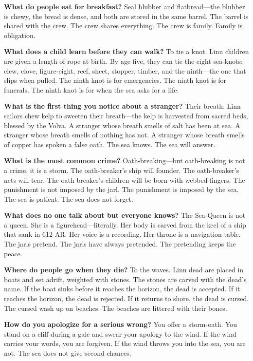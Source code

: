 \begin{almanac}
\textbf{What do people eat for breakfast?} Seal blubber and flatbread---the blubber is chewy, the bread is dense, and both are stored in the same barrel. The barrel is shared with the crew. The crew shares everything. The crew is family. Family is obligation.

\textbf{What does a child learn before they can walk?} To tie a knot. Linn children are given a length of rope at birth. By age five, they can tie the eight sea-knots: clew, clove, figure-eight, reef, sheet, stopper, timber, and the ninth---the one that slips when pulled. The ninth knot is for emergencies. The ninth knot is for funerals. The ninth knot is for when the sea asks for a life.

\textbf{What is the first thing you notice about a stranger?} Their breath. Linn sailors chew kelp to sweeten their breath---the kelp is harvested from sacred beds, blessed by the Volva. A stranger whose breath smells of salt has been at sea. A stranger whose breath smells of nothing has not. A stranger whose breath smells of copper has spoken a false oath. The sea knows. The sea will answer.

\textbf{What is the most common crime?} Oath-breaking---but oath-breaking is not a crime, it is a storm. The oath-breaker's ship will founder. The oath-breaker's nets will tear. The oath-breaker's children will be born with webbed fingers. The punishment is not imposed by the jarl. The punishment is imposed by the sea. The sea is patient. The sea does not forget.

\textbf{What does no one talk about but everyone knows?} The Sea-Queen is not a queen. She is a figurehead---literally. Her body is carved from the keel of a ship that sank in 612 AR. Her voice is a recording. Her throne is a navigation table. The jarls pretend. The jarls have always pretended. The pretending keeps the peace.

\textbf{Where do people go when they die?} To the waves. Linn dead are placed in boats and set adrift, weighted with stones. The stones are carved with the dead's name. If the boat sinks before it reaches the horizon, the dead is accepted. If it reaches the horizon, the dead is rejected. If it returns to shore, the dead is cursed. The cursed wash up on beaches. The beaches are littered with their bones.

\textbf{How do you apologize for a serious wrong?} You offer a storm-oath. You stand on a cliff during a gale and swear your apology to the wind. If the wind carries your words, you are forgiven. If the wind throws you into the sea, you are not. The sea does not give second chances.


\end{almanac}
